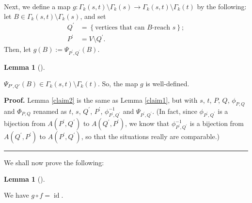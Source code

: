 \documentclass[numbers=enddot,12pt,final,onecolumn,notitlepage]{scrartcl}%
\theoremstyle{definition}
\newtheorem{lem}[theo]{Lemma}
\newenvironment{lemma}[1][]
{\begin{lem}[#1]\begin{leftbar}}
{\end{leftbar}\end{lem}}
\newenvironment{proof}[1][Proof]{\noindent\textbf{#1.} }{\ \rule{0.5em}{0.5em}}
\theoremstyle{plainsl}
\begin{document}
Next, we define a map $g: \Gamma_{k}(s,t) \setminus \Gamma_{k}(s) \to \Gamma_{k}(s,t) \setminus \Gamma_{k}(t)$ by the following: let $B \in \Gamma_{k}(s,t) \setminus \Gamma_{k}(s)$, and set%
\begin{align*}
Q^{\prime}  &  =\left\{  \text{vertices that can }B\text{-reach }s\right\}
;\\
P^{\prime}  &  =V\setminus Q^{\prime}.
\end{align*}
Then, let $g\left(  B\right)  :=\Psi_{P^{\prime},Q^{\prime}}\left(  B\right)
$.

\begin{lemma}
\label{claim2}
    $\Psi_{P',Q'}(B) \in  \Gamma_{k}(s,t) \setminus \Gamma_{k}(t)$. So, the map $g$ is well-defined.
\end{lemma}

\begin{proof}
    Lemma \ref{claim2} is the same as Lemma \ref{claim1}, but with $s$, $t$, $P$,
$Q$, $\phi_{P,Q}$ and $\Phi_{P,Q}$ renamed as $t$, $s$, $Q^{\prime}$,
$P^{\prime}$, $\phi_{P^{\prime},Q^{\prime}}^{-1}$ and $\Psi_{P^{\prime
},Q^{\prime}}$. (In fact, since $\phi_{P^{\prime},Q^{\prime}}$ is a bijection
from $A\left(  P^{\prime},Q^{\prime}\right)  $ to $A\left(  Q^{\prime
},P^{\prime}\right)  $, we know that $\phi_{P^{\prime},Q^{\prime}}^{-1}$ is a
bijection from $A\left(  Q^{\prime},P^{\prime}\right)  $ to $A\left(
P^{\prime},Q^{\prime}\right)  $, so that the situations really are comparable.)
\end{proof}

We shall now prove the following:
\begin{lemma}
\label{claim3}
    We have $g\circ f=\operatorname*{id}$.
\end{lemma}
\end{document}
